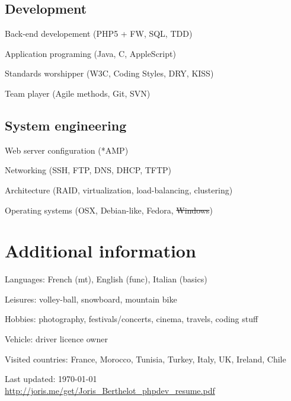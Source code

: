 \documentclass[letterpaper]{article}
\def\footerlink{http://joris.me/get/Joris\_Berthelot\_phpdev\_resume.pdf}
\renewenvironment{itemize}{
    \begin{list}{}{
        \setlength{\leftmargin}{1.5em}
    }
}{
    \end{list}
}
\begin{document}
        \subsection*{Development}
            
            \begin{itemize}
                \item Back-end developement (PHP5 + FW, SQL, TDD)
                \item Application programing (Java, C, AppleScript)
                \item Standards worshipper (W3C, Coding Styles, DRY, KISS)
                \item Team player (Agile methods, Git, SVN)
            \end{itemize}
            
        \subsection*{System engineering}
            
            \begin{itemize}
                \item Web server configuration (*AMP)
                \item Networking (SSH, FTP, DNS, DHCP, TFTP)
                \item Architecture (RAID, virtualization, load-balancing, clustering)
                \item Operating systems (OSX, Debian-like, Fedora, \sout{Windows})
            \end{itemize}
            
    \section*{Additional information}
        
        \begin{itemize}
            \item Languages: French (mt), English (func), Italian (basics)
            \item Leisures: volley-ball, snowboard, mountain bike
            \item Hobbies: photography, festivals/concerts, cinema, travels, coding stuff
            \item Vehicle: driver licence owner
            \item Visited countries: France, Morocco, Tunisia, Turkey, Italy, UK, Ireland, Chile
        \end{itemize}
        
    \vfill
    
    \begin{center}
        \begin{footnotesize}
            Last updated: \today \\
            \href{\footerlink}{ \footerlink}
        \end{footnotesize}
    \end{center}
\end{document}

